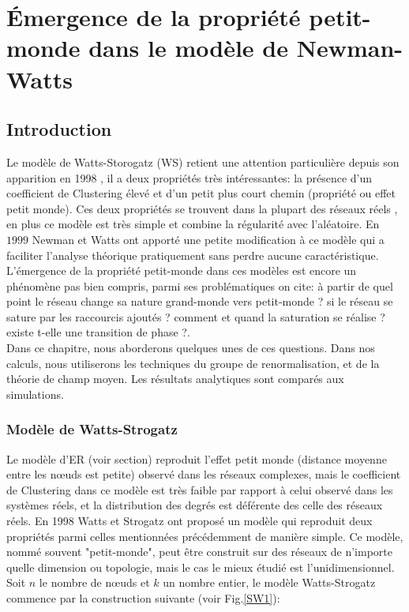 \chapter{Émergence de la propriété petit-monde dans le modèle de Newman-Watts}
\label{sec3}
\begin{minipage}{\textwidth}
	\linespread{1.2}
	\minitoc
\end{minipage}
\section{Introduction}

Le modèle de Watts-Storogatz (WS) retient une attention particulière depuis son apparition en 1998 \cite{Watss-Strogatz1998}, il a deux propriétés très intéressantes: la présence d'un coefficient de Clustering élevé et d'un petit plus court chemin (propriété ou effet petit monde). Ces deux propriétés se trouvent dans la plupart des réseaux réels \cite{Cohen-Havlinl2010,Newman2010}, en plus ce modèle est très simple et combine la régularité avec l'aléatoire. En $1999$ Newman et Watts \cite{Newman-Watts1999} ont apporté une petite modification à ce modèle qui a faciliter l'analyse théorique pratiquement sans perdre aucune caractéristique.\\
L'émergence de la propriété petit-monde dans ces modèles est encore un phénomène pas bien compris, parmi ses problématiques on cite: à partir de quel point le réseau change sa nature grand-monde vers petit-monde ? si le réseau se sature par les raccourcis ajoutés ? comment et quand la saturation se réalise ? existe t-elle  une transition de phase ?. \\
Dans ce chapitre, nous aborderons quelques unes de ces questions. Dans nos calculs, nous utiliserons les techniques du groupe de renormalisation, et de la théorie de champ moyen. Les résultats analytiques sont  comparés aux simulations.

 \subsection{Modèle de Watts-Strogatz}
 
 
 Le modèle d'ER (voir section) reproduit l'effet petit monde (distance moyenne entre les nœuds est petite) observé dans les réseaux complexes, mais le coefficient de Clustering dans ce modèle est très faible par rapport à celui observé dans les systèmes réels, et la distribution des degrés est déférente des celle des réseaux réels. En 1998 Watts et Strogatz \cite{Watss-Strogatz1998} ont proposé un modèle qui reproduit deux propriétés parmi celles mentionnées précédemment de manière simple. Ce modèle, nommé souvent "petit-monde", peut être construit sur des réseaux de n'importe quelle dimension ou topologie, mais le cas le mieux étudié est l'unidimensionnel. Soit $n$ le nombre de nœuds et $k$ un nombre entier, le modèle Watts-Strogatz commence par la construction suivante (voir Fig.\ref{SW1}): 
 
